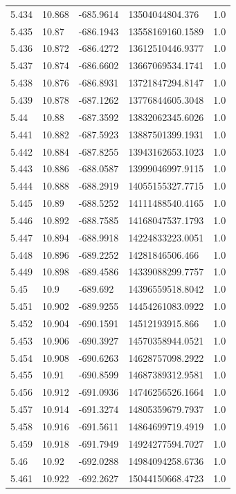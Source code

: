 \begin{tabular}{lllll}
5.434 & 10.868 & -685.9614 & 13504044804.376 & 1.0 \\
5.435 & 10.87 & -686.1943 & 13558169160.1589 & 1.0 \\
5.436 & 10.872 & -686.4272 & 13612510446.9377 & 1.0 \\
5.437 & 10.874 & -686.6602 & 13667069534.1741 & 1.0 \\
5.438 & 10.876 & -686.8931 & 13721847294.8147 & 1.0 \\
5.439 & 10.878 & -687.1262 & 13776844605.3048 & 1.0 \\
5.44 & 10.88 & -687.3592 & 13832062345.6026 & 1.0 \\
5.441 & 10.882 & -687.5923 & 13887501399.1931 & 1.0 \\
5.442 & 10.884 & -687.8255 & 13943162653.1023 & 1.0 \\
5.443 & 10.886 & -688.0587 & 13999046997.9115 & 1.0 \\
5.444 & 10.888 & -688.2919 & 14055155327.7715 & 1.0 \\
5.445 & 10.89 & -688.5252 & 14111488540.4165 & 1.0 \\
5.446 & 10.892 & -688.7585 & 14168047537.1793 & 1.0 \\
5.447 & 10.894 & -688.9918 & 14224833223.0051 & 1.0 \\
5.448 & 10.896 & -689.2252 & 14281846506.466 & 1.0 \\
5.449 & 10.898 & -689.4586 & 14339088299.7757 & 1.0 \\
5.45 & 10.9 & -689.692 & 14396559518.8042 & 1.0 \\
5.451 & 10.902 & -689.9255 & 14454261083.0922 & 1.0 \\
5.452 & 10.904 & -690.1591 & 14512193915.866 & 1.0 \\
5.453 & 10.906 & -690.3927 & 14570358944.0521 & 1.0 \\
5.454 & 10.908 & -690.6263 & 14628757098.2922 & 1.0 \\
5.455 & 10.91 & -690.8599 & 14687389312.9581 & 1.0 \\
5.456 & 10.912 & -691.0936 & 14746256526.1664 & 1.0 \\
5.457 & 10.914 & -691.3274 & 14805359679.7937 & 1.0 \\
5.458 & 10.916 & -691.5611 & 14864699719.4919 & 1.0 \\
5.459 & 10.918 & -691.7949 & 14924277594.7027 & 1.0 \\
5.46 & 10.92 & -692.0288 & 14984094258.6736 & 1.0 \\
5.461 & 10.922 & -692.2627 & 15044150668.4723 & 1.0 \\

\end{tabular}

